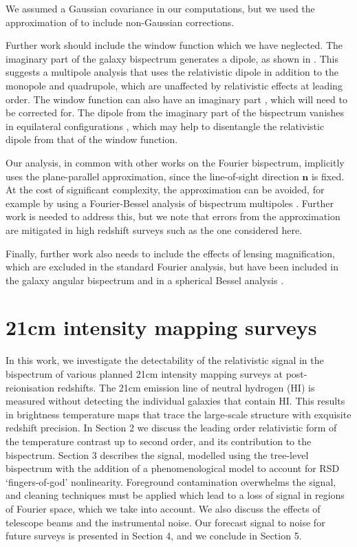 We assumed a Gaussian covariance in our computations, but we used the approximation  of \cite{Chan:2016ehg} to include non-Gaussian corrections. 

Further work should include the window function which we have  neglected.
The imaginary part of the galaxy bispectrum generates a dipole, as shown in \cite{Clarkson:2018dwn}. This suggests a multipole analysis that uses the relativistic dipole in addition to the monopole and quadrupole, {which are unaffected by relativistic effects at leading order.} The
window function can also have an imaginary part \cite{Beutler:2018vpe}, which will need to be corrected for. The dipole from the imaginary part of the bispectrum vanishes in equilateral configurations \cite{Clarkson:2018dwn}, which may help to disentangle the relativistic dipole from that of the window function.

{Our analysis, in common with other works on the Fourier bispectrum, implicitly uses the plane-parallel approximation, since the line-of-sight direction ${\bm{n}}$ is fixed. At the cost of significant complexity, the approximation can be avoided, for example by using a Fourier-Bessel analysis of bispectrum multipoles \cite{Castorina:2017inr}. Further work is needed to address this, but we note that errors from the approximation are mitigated in high redshift surveys such as the one considered here.}

Finally, further work also needs to include the effects of lensing magnification, which are excluded in the standard Fourier analysis, but have been included in the galaxy angular bispectrum \cite{Kehagias:2015tda,DiDio:2015bua, DiDio:2016gpd, DiDio:2018unb} and in a spherical Bessel analysis \cite{Bertacca:2017dzm}. 
%
%
%
%
%
%
%
%
%
%
%
%
\section{21cm intensity mapping surveys}
%
In this work, we investigate the detectability of the relativistic signal in the bispectrum of various planned 21cm intensity mapping surveys at post-reionisation redshifts. 
The 21cm emission line of neutral hydrogen (HI) is measured without detecting the individual galaxies that contain HI. This results in brightness temperature maps that trace the large-scale structure with exquisite redshift precision. In Section 2 we discuss the leading order relativistic form of the temperature contrast up to second order, and its contribution to the bispectrum. Section 3 describes the signal, modelled using the tree-level bispectrum with the addition of a phenomenological model to account for RSD `fingers-of-god' nonlinearity.
Foreground contamination overwhelms the signal, and cleaning techniques must be applied which lead to a loss of signal in regions of Fourier space, which we take into account. We also discuss the effects of telescope beams and the instrumental noise. Our forecast signal to noise for future surveys is presented in Section 4, and we conclude in Section 5.

